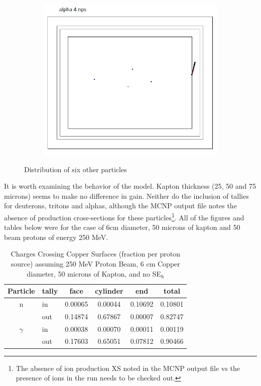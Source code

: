 \documentclass{mc2015}
\begin{document}
\begin{figure}[H]
\begin{subfigure}[b]{0.2\textwidth}
        \end{subfigure}
        \begin{subfigure}[b]{0.2\textwidth}
                \includegraphics[width=\textwidth]{figures/fig_mcnp_dist_a.png}
                \label{fig:mcnp_dist_a}
        \end{subfigure}
        \caption{Distribution of six other particles}
        \label{fig:mcnp_dist}
\end{figure}

It is worth examining the behavior of the model. Kapton thickness (25, 50 and 75 microns) seems to make no difference in gain. Neither do the inclusion of tallies for deuterons, tritons and alphas, although the MCNP output file notes the absence of production cross-sections for these particles\footnote{The absence of ion production XS noted in the MCNP output file vs the presence of ions in the run needs to be checked out.}. All of the figures and tables below were for the case of 6cm diameter, 50 microns of kapton and 50 beam protons of energy 250 MeV.

\begin{table}[H]
  \centering
  \caption{Charges Crossing Copper Surfaces (fraction per proton source) assuming 250 MeV Proton Beam, 6 cm Copper diameter, 50 microns of Kapton, and no SE$_\text{h}$}
  \begin{tabular}{clcccc}
    \toprule
    Particle & tally & face & cylinder & end & total \\
    \midrule
    n  & in & \num{0.00065} & \num{0.00044} & \num{0.10692} & \num{0.10801} \\
       & out & \num{0.14874} & \num{0.67867} & \num{0.00007} & \num{0.82747} \\
    \midrule
    $\gamma$ & in & \num{0.00038} & \num{0.00070} & \num{0.00011} & \num{0.00119} \\
             & out & \num{0.17603} & \num{0.65051} & \num{0.07812} & \num{0.90466} \\
    \bottomrule
  \end{tabular}
  \label{tab:mcnp_neutral_crossing}
\end{table}
\end{document}
